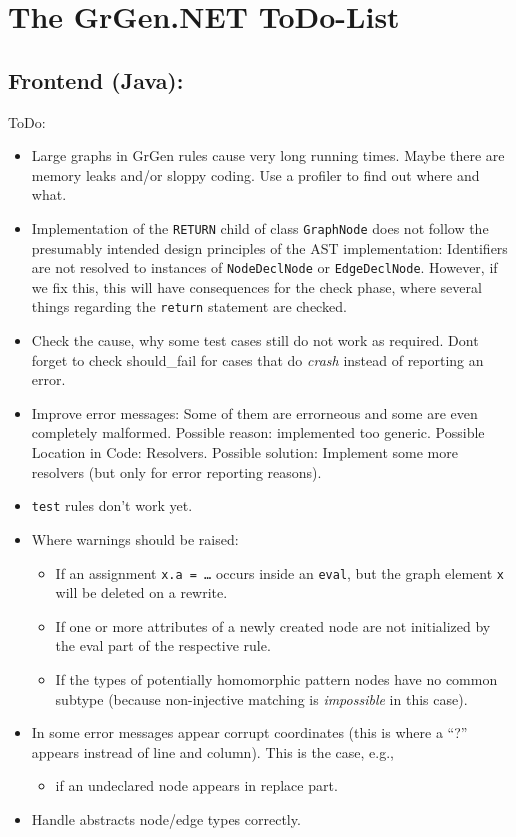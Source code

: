 \documentclass[12pt,a4paper]{article}
\begin{document}
\section*{\LARGE The GrGen.NET ToDo-List}



\subsection*{Frontend (Java):}
ToDo:
\begin{itemize}
	\item Large graphs in GrGen rules cause very long running times. Maybe there are memory leaks and/or sloppy coding.
		Use a profiler to find out where and what.
	\item
		Implementation of the {\tt RETURN} child of class {\tt GraphNode} does not follow the presumably intended design principles of the AST implementation:
		Identifiers are not resolved to instances of {\tt NodeDeclNode} or {\tt EdgeDeclNode}.
		However, if we fix this, this will have consequences for the check phase, where several things regarding the {\tt return} statement are checked.
	\item Check the cause, why some test cases still do not work as required.
		Dont forget to check should\_fail for cases that do \emph{crash} instead of reporting an error.
	\item Improve error messages: Some of them are errorneous and some are even completely malformed. Possible reason: implemented too generic. Possible Location in Code: Resolvers. Possible solution: Implement some more resolvers (but only for error reporting reasons).
    \item {\tt test} rules don't work yet.
	\item Where warnings should be raised:
		\begin{itemize}
			\item If an assignment {\tt x.a = \dots} occurs inside an {\tt eval}, but the graph element {\tt x} will be deleted on a rewrite.
			\item If one or more attributes of a newly created node are not initialized by the eval part of the respective rule.
			\item If the types of potentially homomorphic pattern nodes have no common subtype (because non-injective matching is \emph{impossible} in this case).
		\end{itemize}
	\item In some error messages appear corrupt coordinates (this is where a "`?"' appears instread of line and column).
		This is the case, e.g.,
		\begin{itemize}
			\item if an undeclared node appears in replace part.
		\end{itemize}
	\item Handle abstracts node/edge types correctly.
\end{itemize}
\end{document}
